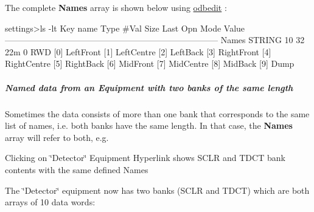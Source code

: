 The complete {\bfseries Names} array is shown below using \hyperlink{RC_odbedit_utility}{odbedit} :


\begin{DoxyCode}
settings>ls -lt
Key name                        Type    #Val  Size  Last Opn Mode Value
---------------------------------------------------------------------------
 Names                           STRING  10    32    22m  0   RWD
                                        [0]             LeftFront
                                        [1]             LeftCentre
                                        [2]             LeftBack
                                        [3]             RightFront
                                        [4]             RightCentre
                                        [5]             RightBack
                                        [6]             MidFront
                                        [7]             MidCentre
                                        [8]             MidBack
                                        [9]             Dump
\end{DoxyCode}


\par


\par
\hypertarget{RC_mhttpd_Equipment_page_RC_mhttpd_Equipment_example3}{}\subparagraph{Named data from an Equipment with two banks of the same length}\label{RC_mhttpd_Equipment_page_RC_mhttpd_Equipment_example3}
Sometimes the data consists of more than one bank that corresponds to the same list of names, i.e. both banks have the same length. In that case, the {\bfseries Names} array will refer to both, e.g. \par
\par
 \begin{center} Clicking on \char`\"{}Detector\char`\"{} Equipment Hyperlink shows SCLR and TDCT bank contents with the same defined Names \par
\par
\par
  \end{center}  \par
\par
\par


The \char`\"{}Detector\char`\"{} equipment now has two banks (SCLR and TDCT) which are both arrays of 10 data words:


